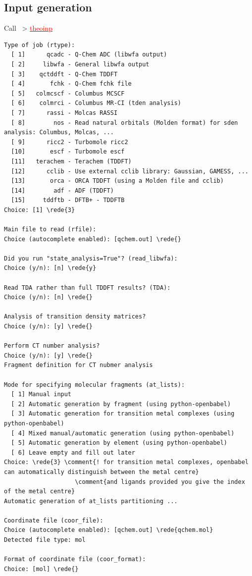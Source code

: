 \documentclass[DIV=12,headings=normal]{scrartcl}
\newcommand{\comment}[1]{\textcolor{blue}{#1}}
\newcommand{\redl}[1]{{\textcolor{red}{\underline{#1}}}}
\newcommand{\rede}[1]{\redl{#1 <ENTER>}}
\newcommand{\comm}[1]{
\small
~> \redl{#1}
\normalsize
}
\newcounter{number}
\begin{document}
\subsection{Input generation}
Call \comm{theoinp}
\scriptsize
\begin{Verbatim}[commandchars=\\\{\}]
Type of job (rtype):
  [ 1]      qcadc - Q-Chem ADC (libwfa output)
  [ 2]     libwfa - General libwfa output
  [ 3]    qctddft - Q-Chem TDDFT
  [ 4]       fchk - Q-Chem fchk file
  [ 5]   colmcscf - Columbus MCSCF
  [ 6]    colmrci - Columbus MR-CI (tden analysis)
  [ 7]      rassi - Molcas RASSI
  [ 8]        nos - Read natural orbitals (Molden format) for sden analysis: Columbus, Molcas, ...
  [ 9]      ricc2 - Turbomole ricc2
  [10]       escf - Turbomole escf
  [11]   terachem - Terachem (TDDFT)
  [12]      cclib - Use external cclib library: Gaussian, GAMESS, ...
  [13]       orca - ORCA TDDFT (using a Molden file and cclib)
  [14]        adf - ADF (TDDFT)
  [15]     tddftb - DFTB+ - TDDFTB
Choice: [1] \rede{3}

Main file to read (rfile):
Choice (autocomplete enabled): [qchem.out] \rede{}

Did you run "state_analysis=True"? (read_libwfa):
Choice (y/n): [n] \rede{y}

Read TDA rather than full TDDFT results? (TDA):
Choice (y/n): [n] \rede{}

Analysis of transition density matrices?
Choice (y/n): [y] \rede{}

Perform CT number analysis?
Choice (y/n): [y] \rede{}
Fragment definition for CT nubmer analysis

Mode for specifying molecular fragments (at_lists):
  [ 1] Manual input
  [ 2] Automatic generation by fragment (using python-openbabel)
  [ 3] Automatic generation for transition metal complexes (using python-openbabel)
  [ 4] Mixed manual/automatic generation (using python-openbabel)
  [ 5] Automatic generation by element (using python-openbabel)
  [ 6] Leave empty and fill out later
Choice: \rede{3} \comment{! for transition metal complexes, openbabel can automatically distinguish between the metal centre} 
                    \comment{and ligands provided you give the index of the metal centre}
Automatic generation of at_lists partitioning ...

Coordinate file (coor_file):
Choice (autocomplete enabled): [qchem.out] \rede{qchem.mol}
Detected file type: mol

Format of coordinate file (coor_format):
Choice: [mol] \rede{}


\end{Verbatim}
\end{document}
